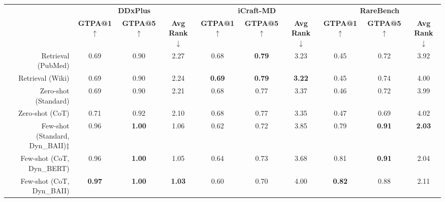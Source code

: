 \setlength{\tabcolsep}{2.3pt}
\begin{table*}[h]
\centering
\scriptsize
\begin{tabular}{rccccccccc}
\toprule
                               & \multicolumn{3}{c}{\textbf{DDxPlus}} & \multicolumn{3}{c}{\textbf{iCraft-MD}} & \multicolumn{3}{c}{\textbf{RareBench}} \\ \cmidrule(lr){2-4} \cmidrule(lr){5-7} \cmidrule(lr){8-10}
                               & \textbf{GTPA@1 $\uparrow$}          & \textbf{GTPA@5 $\uparrow$}   & \textbf{Avg Rank $\downarrow$} & \textbf{GTPA@1 $\uparrow$}       & \textbf{GTPA@5 $\uparrow$}     & \textbf{Avg Rank $\downarrow$}   & \textbf{GTPA@1 $\uparrow$}        & \textbf{GTPA@5 $\uparrow$}   & \textbf{Avg Rank $\downarrow$}     \\\midrule
Retrieval (PubMed)                   & 0.69           &  0.90   &  2.27  & 0.68        &     \textbf{0.79}    & 3.23  & 0.45         &   0.72  &    3.92   \\
Retrieval (Wiki)                   &    0.69        &   0.90 &  2.24  & \textbf{0.69}         &     \textbf{0.79}    & \textbf{3.22}  &   0.45       &  0.74  &  4.00    \\ 
\cmidrule(lr){2-10}
Zero-shot (Standard)                     &     0.69           &     0.90       &      2.21      &       0.68         &      0.77        &         3.37       &       0.46       &      0.72       &   3.99             \\
Zero-shot (CoT)                    &     0.71          &     0.92       &      2.10      &       0.68         &     0.77         &         3.35       &       0.47       &    0.69         &   4.02              \\ %
Few-shot (Standard, Dyn\_BAII)$\ddag$ &      0.96          &      \textbf{1.00}      &    1.06         &        0.62        &        0.72      &     3.85           &     0.79         &   \textbf{0.91}          &      \textbf{2.03}           \\
Few-shot (CoT, Dyn\_BERT)      &       0.96         &    \textbf{1.00}        &  1.05        &     0.64           &      0.73        &         3.68      &     0.81         &  \textbf{0.91}            &          2.04      \\
Few-shot (CoT, Dyn\_BAII)      &       \textbf{0.97}         &     \textbf{1.00}       &       \textbf{1.03}      &         0.60       &      0.70        &        4.00      &         \textbf{0.82}     &      0.88       &         2.11      \\


\end{tabular}
\end{table*}
